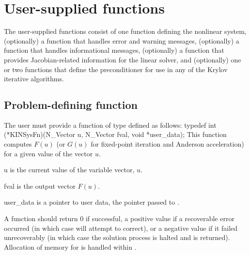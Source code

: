\section{User-supplied functions}\label{ss:user_fct_sol}

The user-supplied functions consist of one function defining the nonlinear system,
(optionally) a function that handles error and warning messages,
(optionally) a function that handles informational messages, 
(optionally) a function that provides Jacobian-related information for the linear
solver, and (optionally) one or two functions that define the preconditioner for 
use in any of the Krylov iterative algorithms.

\subsection{Problem-defining function}\label{ss:sysFn}

The user must provide a function of type  defined as follows:
{
  typedef int (*KINSysFn)(N\_Vector u, N\_Vector fval, void *user\_data);
}
{
  This function computes $F(u)$ (or $G(u)$ for fixed-point iteration and Anderson 
  acceleration) for a given value of the vector $u$.
}
{
  \begin{args}
  \item[u]
    is the current value of the variable vector, $u$.
  \item[fval]
    is the output vector $F(u)$.
  \item[user\_data]
    is a pointer to user data, the pointer       
    passed to .   
  \end{args}
}
{
  A  function should return $0$ if successful, a positive value
  if a recoverable error occurred (in which case {\kinsol} will attempt to
  correct), or a negative value if it failed unrecoverably (in which case
  the solution process is halted and  is returned).
}
{
  Allocation of memory for  is handled within {\kinsol}.
}

